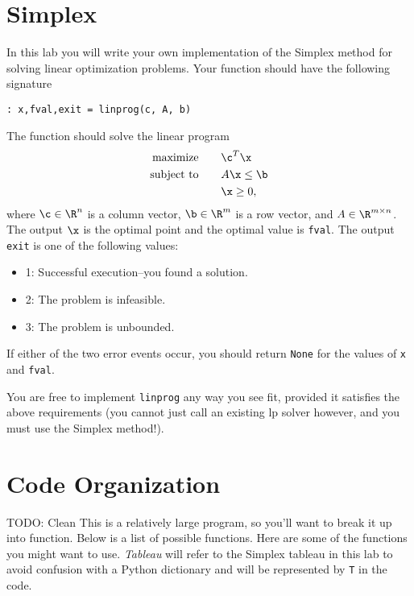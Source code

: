 
\label{lab:Simplex}


\section*{Simplex}
In this lab you will write your own implementation of the Simplex method for solving linear optimization problems. Your function should have the following signature
\begin{lstlisting}[style=python]
: x,fval,exit = linprog(c, A, b)
\end{lstlisting}
The function should solve the linear program
\begin{align*}
	\mbox{maximize}\qquad & \c^T \x \\
	\mbox{subject to}\qquad & A\x \leq \b \\
			&	\x \geq 0,
\end{align*}
where $\c \in \R^n$ is a column vector, $\b \in \R^m$ is a row vector, and $A \in \R^{m \times n}$. The output $\x$ is the optimal point and the optimal value is {\tt fval}. The output {\tt exit} is one of the following values:
\begin{itemize}
	\item 1: Successful execution--you found a solution.
	\item 2: The problem is infeasible.
	\item 3: The problem is unbounded.
\end{itemize}
If either of the two error events occur, you should return {\tt None} for the values of {\tt x} and {\tt fval}.

You are free to implement {\tt linprog} any way you see fit, provided it satisfies the above requirements (you cannot just call an existing lp solver however, and you must use the Simplex method!).


\section{Code Organization}
TODO: Clean
This is a relatively large program, so you'll want to break it up into function. Below is a list of possible functions.
Here are some of the functions you might want to use. \emph{Tableau} will refer to the Simplex tableau in this lab to avoid confusion with a Python dictionary and will be represented by {\tt T}  in the code.


